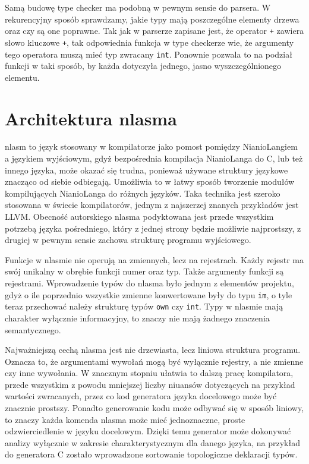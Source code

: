 \documentclass[licencjacka]{pracamgr}
\begin{document}
Samą budowę type checker ma podobną w pewnym sensie do parsera. W rekurencyjny sposób sprawdzamy, jakie typy mają poszczególne elementy drzewa oraz
czy są one poprawne. Tak jak w parserze zapisane jest, że operator \texttt{+} zawiera słowo kluczowe \texttt{+}, tak odpowiednia funkcja w type
checkerze wie, że argumenty tego operatora muszą mieć typ zwracany \texttt{int}. Ponownie pozwala to na podział funkcji w taki sposób, by każda
dotyczyła jednego, jasno wyszczególnionego elementu.
\section{Architektura nlasma}
nlasm to język stosowany w kompilatorze jako pomost pomiędzy NianioLangiem a językiem wyjściowym, gdyż bezpośrednia kompilacja NianioLanga do C, lub
też innego języka, może okazać się trudna, ponieważ używane struktury językowe znacząco od siebie odbiegają. Umożliwia to w łatwy sposób tworzenie
modułów kompilujących NianioLanga do różnych języków. Taka technika jest szeroko stosowana w świecie kompilatorów, jednym z najszerzej znanych
przykładów jest LLVM. Obecność autorskiego nlasma podyktowana jest przede wszystkim potrzebą języka pośredniego, który z jednej strony będzie możliwie
najprostszy, z drugiej w pewnym sensie zachowa strukturę programu wyjściowego.

Funkcje w nlasmie nie operują na zmiennych, lecz na rejestrach. Każdy rejestr ma swój unikalny w obrębie funkcji numer oraz typ. Także argumenty
funkcji są rejestrami. Wprowadzenie typów do nlasma było jednym z elementów projektu, gdyż o ile poprzednio wszystkie zmienne konwertowane były do
typu \texttt{im}, o tyle teraz przechować należy strukturę typów \texttt{own} czy \texttt{int}. Typy w nlasmie mają charakter wyłącznie informacyjny,
to znaczy nie mają żadnego znaczenia semantycznego.

Najważniejszą cechą nlasma jest nie drzewiasta, lecz liniowa struktura programu. Oznacza to, że argumentami wywołań mogą być wyłącznie rejestry, a nie
zmienne czy inne wywołania. W znacznym stopniu ułatwia to dalszą pracę kompilatora, przede wszystkim z powodu mniejszej liczby niuansów dotyczących na
przykład wartości zwracanych, przez co kod generatora języka docelowego może być znacznie prostszy. Ponadto generowanie kodu może odbywać się w sposób
liniowy, to znaczy każda komenda nlasma może mieć jednoznaczne, proste odzwierciedlenie w języku docelowym. Dzięki temu generator może dokonywać
analizy wyłącznie w zakresie charakterystycznym dla danego języka, na przykład do generatora C zostało wprowadzone sortowanie topologiczne deklaracji
typów.
\end{document}
